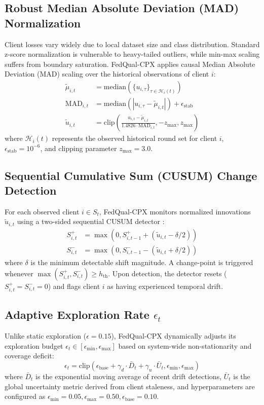 \documentclass[journal,compsoc]{IEEEtran}
\begin{document}
\subsection{Robust Median Absolute Deviation (MAD) Normalization}
Client losses vary widely due to local dataset size and class distribution. Standard z-score normalization is vulnerable to heavy-tailed outliers, while min-max scaling suffers from boundary saturation. FedQual-CPX applies causal Median Absolute Deviation (MAD) scaling over the historical observations of client $i$:
\begin{align}
\tilde{\mu}_{i,t} &= \text{median}(\{u_{i,\tau}\}_{\tau \in \mathcal{H}_i(t)}) \\
\text{MAD}_{i,t} &= \text{median}(|u_{i,\tau} - \tilde{\mu}_{i,t}|) + \epsilon_{\text{stab}} \\
\tilde{u}_{i,t} &= \text{clip}\left(\frac{u_{i,t} - \tilde{\mu}_{i,t}}{1.4826 \cdot \text{MAD}_{i,t}}, -z_{\max}, z_{\max}\right)
\end{align}
where $\mathcal{H}_i(t)$ represents the observed historical round set for client $i$, $\epsilon_{\text{stab}} = 10^{-6}$, and clipping parameter $z_{\max} = 3.0$.

\subsection{Sequential Cumulative Sum (CUSUM) Change Detection}
For each observed client $i \in S_t$, FedQual-CPX monitors normalized innovations $\tilde{u}_{i,t}$ using a two-sided sequential CUSUM detector \cite{page1954continuous, basseville1993detection}:
\begin{align}
S_{i,t}^+ &= \max\left(0, S_{i,t-1}^+ + (\tilde{u}_{i,t} - \delta / 2)\right) \\
S_{i,t}^- &= \max\left(0, S_{i,t-1}^- - (\tilde{u}_{i,t} + \delta / 2)\right)
\end{align}
where $\delta$ is the minimum detectable shift magnitude. A change-point is triggered whenever $\max(S_{i,t}^+, S_{i,t}^-) \ge h_{\text{th}}$. Upon detection, the detector resets ($S_{i,t}^+ = S_{i,t}^- = 0$) and flags client $i$ as having experienced temporal drift.

\subsection{Adaptive Exploration Rate $\epsilon_t$}
Unlike static exploration ($\epsilon=0.15$), FedQual-CPX dynamically adjusts its exploration budget $\epsilon_t \in [\epsilon_{\min}, \epsilon_{\max}]$ based on system-wide non-stationarity and coverage deficit:
\begin{equation}
\epsilon_t = \text{clip}\left(\epsilon_{\text{base}} + \gamma_d \cdot \bar{D}_t + \gamma_u \cdot \bar{U}_t, \epsilon_{\min}, \epsilon_{\max}\right)
\end{equation}
where $\bar{D}_t$ is the exponential moving average of recent drift detections, $\bar{U}_t$ is the global uncertainty metric derived from client staleness, and hyperparameters are configured as $\epsilon_{\min}=0.05, \epsilon_{\max}=0.50, \epsilon_{\text{base}}=0.10$.
\end{document}
